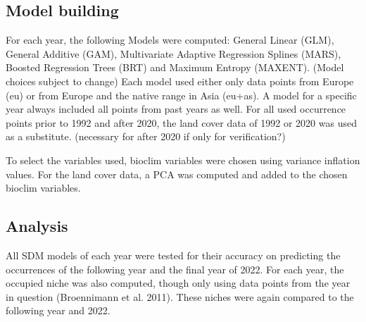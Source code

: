 \documentclass[12pt]{article}
\begin{document}
\subsection{Model building}
For each year, the following Models were computed: General Linear (GLM), General Additive (GAM), Multivariate Adaptive Regression Splines (MARS), Boosted Regression Trees (BRT) and Maximum Entropy (MAXENT). 
(Model choices subject to change)
Each model used either only data points from Europe (eu) or from Europe and the native range in Asia (eu+as). 
A model for a specific year always included all points from past years as well.
For all used occurrence points prior to 1992 and after 2020, the land cover data of 1992 or 2020 was used as a substitute.
(necessary for after 2020 if only for verification?)

To select the variables used, bioclim variables were chosen using variance inflation values. 
For the land cover data, a PCA was computed and added to the chosen bioclim variables.

\subsection{Analysis}
All SDM models of each year were tested for their accuracy on predicting the occurrences of the following year and the final year of 2022. 
For each year, the occupied niche was also computed, though only using data points from the year in question (Broennimann et al. 2011). 
These niches were again compared to the following year and 2022.
\end{document}
